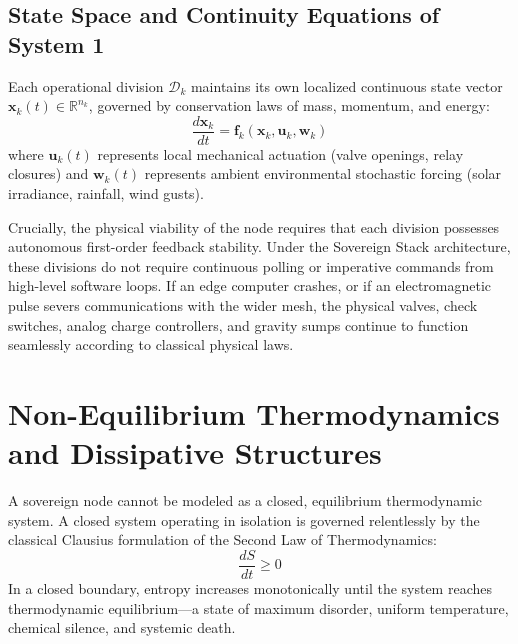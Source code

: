 \subsection{State Space and Continuity Equations of System 1}
Each operational division $\mathcal{D}_k$ maintains its own localized continuous state vector $\mathbf{x}_k(t) \in \mathbb{R}^{n_k}$, governed by conservation laws of mass, momentum, and energy:
\begin{equation}
\frac{d\mathbf{x}_k}{dt} = \mathbf{f}_k(\mathbf{x}_k, \mathbf{u}_k, \mathbf{w}_k)
\label{eq:division_state_dynamics}
\end{equation}
where $\mathbf{u}_k(t)$ represents local mechanical actuation (valve openings, relay closures) and $\mathbf{w}_k(t)$ represents ambient environmental stochastic forcing (solar irradiance, rainfall, wind gusts).

Crucially, the physical viability of the node requires that each division possesses autonomous first-order feedback stability. Under the Sovereign Stack architecture, these divisions do not require continuous polling or imperative commands from high-level software loops. If an edge computer crashes, or if an electromagnetic pulse severs communications with the wider mesh, the physical valves, check switches, analog charge controllers, and gravity sumps continue to function seamlessly according to classical physical laws.

\section{Non-Equilibrium Thermodynamics and Dissipative Structures}
\label{sec:intro_thermo}

A sovereign node cannot be modeled as a closed, equilibrium thermodynamic system. A closed system operating in isolation is governed relentlessly by the classical Clausius formulation of the Second Law of Thermodynamics:
\begin{equation}
\frac{dS}{dt} \ge 0
\label{eq:clausius_second_law}
\end{equation}
In a closed boundary, entropy increases monotonically until the system reaches thermodynamic equilibrium---a state of maximum disorder, uniform temperature, chemical silence, and systemic death.

